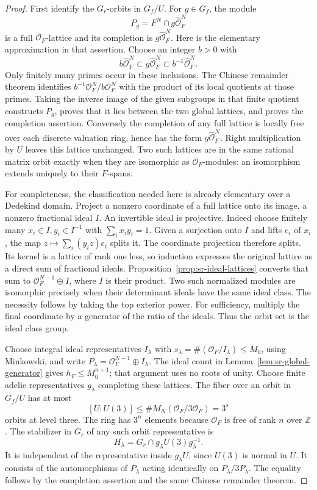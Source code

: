 \begin{proof}
First identify the \(G_r\)-orbits in \(G_f/U\).
For \(g\in G_f\), the module
\[
                P_g=F^N\cap g\widehat{\mathcal O}_F^N
\]
is a full \(\mathcal O_F\)-lattice and its completion is
\(g\widehat{\mathcal O}_F^N\).
Here is the elementary approximation in that assertion.
Choose an integer \(b>0\) with
\[
 b\widehat{\mathcal O}_F^N\subset
 g\widehat{\mathcal O}_F^N\subset
 b^{-1}\widehat{\mathcal O}_F^N.
\]
Only finitely many primes occur in these inclusions.
The Chinese remainder theorem identifies
\(b^{-1}\mathcal O_F^N/b\mathcal O_F^N\) with the product of its
local quotients at those primes.
Taking the inverse image of the given subgroups in that finite
quotient constructs \(P_g\), proves that it lies between the two
global lattices, and proves the completion assertion.
Conversely the completion of any full lattice is locally free over
each discrete valuation ring, hence has the form
\(g\widehat{\mathcal O}_F^N\).
Right multiplication by \(U\) leaves this lattice unchanged.
Two such lattices are in the same rational matrix orbit exactly
when they are isomorphic as \(\mathcal O_F\)-modules: an isomorphism
extends uniquely to their \(F\)-spans.

For completeness, the classification needed here is already
elementary over a Dedekind domain.
Project a nonzero coordinate of a full lattice onto its image,
a nonzero fractional ideal \(I\).
An invertible ideal is projective.
Indeed choose finitely many \(x_i\in I,y_i\in I^{-1}\) with
\(\sum_i x_iy_i=1\).
Given a surjection onto \(I\) and lifts \(e_i\) of \(x_i\), the
map \(z\mapsto\sum_i(y_i z)e_i\) splits it.
The coordinate projection therefore splits.
Its kernel is a lattice of rank one less, so induction expresses
the original lattice as a direct sum of fractional ideals.
Proposition~\ref{prop:sr-ideal-lattices} converts that sum to
\(\mathcal O_F^{N-1}\oplus I\), where \(I\) is their product.
Two such normalized modules are isomorphic precisely when their
determinant ideals have the same ideal class.
The necessity follows by taking the top exterior power.
For sufficiency, multiply the final coordinate by a generator of
the ratio of the ideals.
Thus the orbit set is the ideal class group.

Choose integral ideal representatives \(I_\lambda\) with
\(s_\lambda=\#(\mathcal O_F/I_\lambda)\leq M_0\), using
Minkowski, and write
\(P_\lambda=\mathcal O_F^{N-1}\oplus I_\lambda\).
The ideal count in Lemma~\ref{lem:sr-global-generator} gives
\(h_F\leq M_0^{n+1}\); that argument uses no roots of unity.
Choose finite adelic representatives \(g_\lambda\) completing
these lattices.
The fiber over an orbit in \(G_f/U\) has at most
\[
 [U:U(3)]
       \leq\#M_N(\mathcal O_F/3\mathcal O_F)=3^s
\]
orbits at level three.
The ring has \(3^n\) elements because \(\mathcal O_F\) is free of
rank \(n\) over \(\mathbb Z\).
The stabilizer in \(G_r\) of any such orbit representative is
\[
 H_\lambda=G_r\cap g_\lambda U(3)g_\lambda^{-1}.
\]
It is independent of the representative inside \(g_\lambda U\),
since \(U(3)\) is normal in \(U\).
It consists of the automorphisms of \(P_\lambda\) acting identically
on \(P_\lambda/3P_\lambda\).
The equality follows by the completion assertion and the same
Chinese remainder theorem.


\end{proof}
